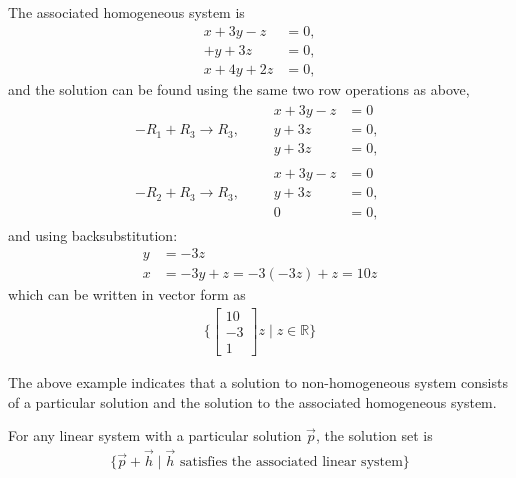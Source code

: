 \begin{example}
The associated homogeneous system is 
%
\begin{align*}
x + 3y -z & = 0, \\
   + y + 3z & = 0, \\
x+4y +2z & = 0,
\end{align*}
and the solution can be found using the same two row operations as above,
%
\begin{align*}
-R_1+R_3 \rightarrow R_3, \qquad
\begin{split}
x + 3y - z & = 0 \\
y + 3z & = 0, \\
y + 3z & = 0, 
\end{split} \\[12pt]
-R_2 + R_3 \rightarrow R_3, \qquad
\begin{split}
x + 3y - z & = 0 \\
y + 3z & = 0, \\
0 & = 0,   
\end{split} 
\end{align*}
and using backsubstitution:
%
\begin{align*}
y & = -3z \\
x & = -3y+z = -3(-3z)+z = 10z
\end{align*}
which can be written in vector form as 
%
\begin{align*}
\{ \begin{bmatrix}
10 \\ -3 \\ 1 
\end{bmatrix}z \; | \; z \in \mathbb{R} \} 
\end{align*}

\end{example}


The above example indicates that a solution to non-homogeneous system consists of a particular solution and the solution to the associated homogeneous system.  

\begin{lemma}
For any linear system with a particular solution $\vec{p}$, the solution set is 
%
\begin{align*}
\{ \vec{p} + \vec{h} \; | \; \text{$\vec{h}$ satisfies the associated linear system} \}
\end{align*}
\end{lemma}

